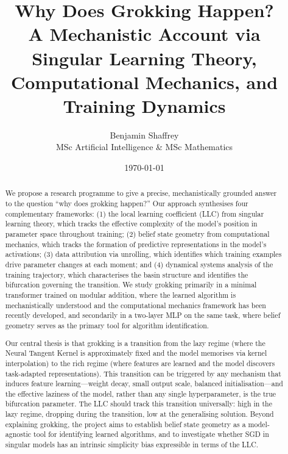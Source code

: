 \documentclass[11pt,a4paper]{article}
\title{\textbf{Why Does Grokking Happen?} \\ 
\large A Mechanistic Account via Singular Learning Theory, \\
Computational Mechanics, and Training Dynamics}
\author{Benjamin Shaffrey \\
MSc Artificial Intelligence \& MSc Mathematics}
\date{\today}
\begin{document}
\maketitle

\begin{abstract}
We propose a research programme to give a precise, mechanistically grounded answer to the question ``why does grokking happen?'' Our approach synthesises four complementary frameworks: (1) the local learning coefficient (LLC) from singular learning theory, which tracks the effective complexity of the model's position in parameter space throughout training; (2) belief state geometry from computational mechanics, which tracks the formation of predictive representations in the model's activations; (3) data attribution via unrolling, which identifies which training examples drive parameter changes at each moment; and (4) dynamical systems analysis of the training trajectory, which characterises the basin structure and identifies the bifurcation governing the transition. We study grokking primarily in a minimal transformer trained on modular addition, where the learned algorithm is mechanistically understood and the computational mechanics framework has been recently developed, and secondarily in a two-layer MLP on the same task, where belief geometry serves as the primary tool for algorithm identification.

Our central thesis is that grokking is a transition from the lazy regime (where the Neural Tangent Kernel is approximately fixed and the model memorises via kernel interpolation) to the rich regime (where features are learned and the model discovers task-adapted representations). This transition can be triggered by any mechanism that induces feature learning---weight decay, small output scale, balanced initialisation---and the effective laziness of the model, rather than any single hyperparameter, is the true bifurcation parameter. The LLC should track this transition universally: high in the lazy regime, dropping during the transition, low at the generalising solution. Beyond explaining grokking, the project aims to establish belief state geometry as a model-agnostic tool for identifying learned algorithms, and to investigate whether SGD in singular models has an intrinsic simplicity bias expressible in terms of the LLC.
\end{abstract}

\tableofcontents
\newpage

\end{document}
